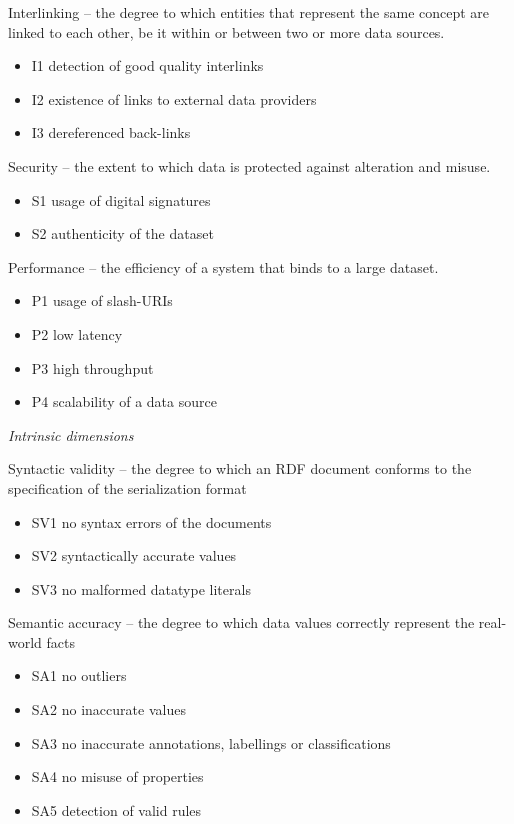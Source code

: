 Interlinking -- the degree to which entities that represent the same concept are linked to each other, be it within or between two or more data sources.
\begin{itemize}
 \setlength{\parskip}{0pt}
 \setlength{\itemsep}{0pt plus 1pt}
 \item I1 detection of good quality interlinks
 \item I2 existence of links to external data providers
 \item I3 dereferenced back-links
\end{itemize}

Security -- the extent to which data is protected against alteration and misuse.
\begin{itemize}
 \setlength{\parskip}{0pt}
 \setlength{\itemsep}{0pt plus 1pt}
 \item S1 usage of digital signatures
 \item S2 authenticity of the dataset
\end{itemize}

Performance -- the efficiency of a system that binds to a large dataset.
\begin{itemize}
 \setlength{\parskip}{0pt}
 \setlength{\itemsep}{0pt plus 1pt}
 \item P1 usage of slash-URIs
 \item P2 low latency
 \item P3 high throughput
 \item P4 scalability of a data source
\end{itemize}

\emph{Intrinsic dimensions}

Syntactic validity -- the degree to which an RDF document conforms to the specification of the serialization format
\begin{itemize}
 \setlength{\parskip}{0pt}
 \setlength{\itemsep}{0pt plus 1pt}
 \item SV1 no syntax errors of the documents
 \item SV2 syntactically accurate values
 \item SV3 no malformed datatype literals
\end{itemize}

Semantic accuracy -- the degree to which data values correctly represent the real-world facts
\begin{itemize}
 \setlength{\parskip}{0pt}
 \setlength{\itemsep}{0pt plus 1pt}
 \item SA1 no outliers
 \item SA2 no inaccurate values
 \item SA3 no inaccurate annotations, labellings or classifications
 \item SA4 no misuse of properties
 \item SA5 detection of valid rules
\end{itemize}

